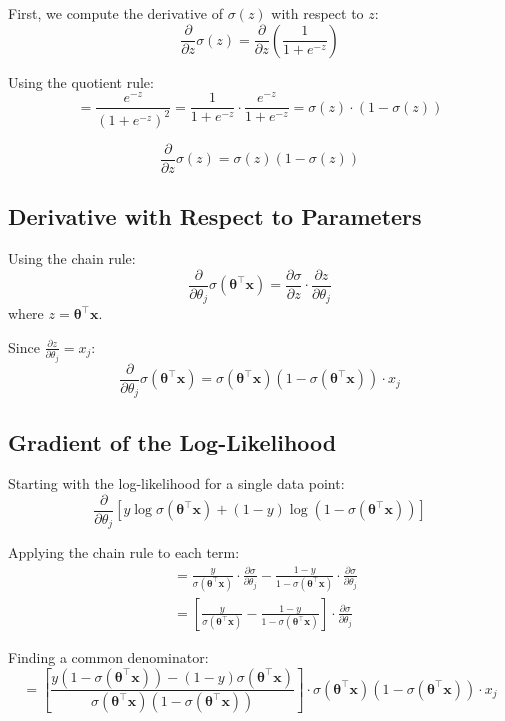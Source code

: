 \documentclass[main.tex]{subfiles}
\begin{document}
First, we compute the derivative of $\sigma(z)$ with respect to $z$:
$$\frac{\partial}{\partial z} \sigma(z) = \frac{\partial}{\partial z} \left( \frac{1}{1 + e^{-z}} \right)$$

Using the quotient rule:
$$= \frac{e^{-z}}{(1 + e^{-z})^2} = \frac{1}{1 + e^{-z}} \cdot \frac{e^{-z}}{1 + e^{-z}} = \sigma(z) \cdot (1 - \sigma(z))$$

$$\boxed{\frac{\partial}{\partial z} \sigma(z) = \sigma(z)(1 - \sigma(z))}$$

\subsection{Derivative with Respect to Parameters}

Using the chain rule:
$$\frac{\partial}{\partial \theta_j} \sigma(\boldsymbol{\theta}^\top \mathbf{x}) = \frac{\partial \sigma}{\partial z} \cdot \frac{\partial z}{\partial \theta_j}$$
where $z = \boldsymbol{\theta}^\top \mathbf{x}$.

Since $\frac{\partial z}{\partial \theta_j} = x_j$:
$$\boxed{\frac{\partial}{\partial \theta_j} \sigma(\boldsymbol{\theta}^\top \mathbf{x}) = \sigma(\boldsymbol{\theta}^\top \mathbf{x})(1 - \sigma(\boldsymbol{\theta}^\top \mathbf{x})) \cdot x_j}$$

\subsection{Gradient of the Log-Likelihood}

Starting with the log-likelihood for a single data point:
$$\frac{\partial}{\partial \theta_j} \left[ y \log \sigma(\boldsymbol{\theta}^\top \mathbf{x}) + (1-y) \log(1 - \sigma(\boldsymbol{\theta}^\top \mathbf{x})) \right]$$

Applying the chain rule to each term:
\begin{align}
&= \frac{y}{\sigma(\boldsymbol{\theta}^\top \mathbf{x})} \cdot \frac{\partial \sigma}{\partial \theta_j} - \frac{1-y}{1 - \sigma(\boldsymbol{\theta}^\top \mathbf{x})} \cdot \frac{\partial \sigma}{\partial \theta_j} \\[8pt]
&= \left[ \frac{y}{\sigma(\boldsymbol{\theta}^\top \mathbf{x})} - \frac{1-y}{1 - \sigma(\boldsymbol{\theta}^\top \mathbf{x})} \right] \cdot \frac{\partial \sigma}{\partial \theta_j}
\end{align}

Finding a common denominator:
$$= \left[ \frac{y(1 - \sigma(\boldsymbol{\theta}^\top \mathbf{x})) - (1-y)\sigma(\boldsymbol{\theta}^\top \mathbf{x})}{\sigma(\boldsymbol{\theta}^\top \mathbf{x})(1 - \sigma(\boldsymbol{\theta}^\top \mathbf{x}))} \right] \cdot \sigma(\boldsymbol{\theta}^\top \mathbf{x})(1 - \sigma(\boldsymbol{\theta}^\top \mathbf{x})) \cdot x_j$$
\end{document}
